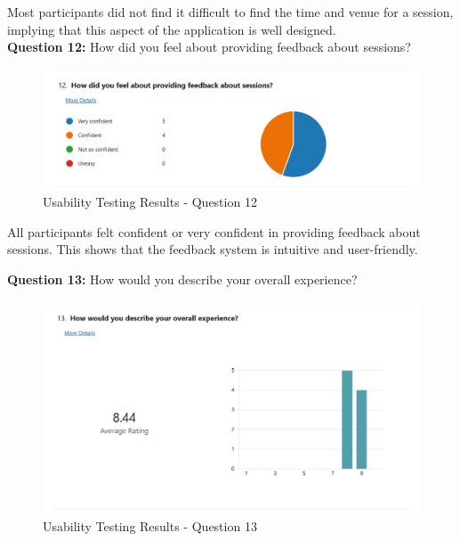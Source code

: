 \begin{justify}
\vspace{0.25cm}
\newendline  Most participants did not find it difficult to find the time and venue for a session, implying that this aspect of the application is well designed.\\


\vspace{0.25cm}
\newendline \textbf{Question 12:} How did you feel about providing feedback about sessions?

\begin{figure}[H]
    \centerline{\includegraphics[width=150mm,scale=1]{figures/implementation_and_testing/testing/MUT/answers/Answers (12).png}}
    \caption{Usability Testing Results - Question 12}
    \label{Usability Testing Results - Question 12}
\end{figure}

\vspace{0.25cm}
\newendline All participants felt confident or very confident in providing feedback about sessions. This shows that the feedback system is intuitive and user-friendly.\\


\clearpage

\vspace{0.25cm}
\newendline \textbf{Question 13:} How would you describe your overall experience?

\begin{figure}[H]
    \centerline{\includegraphics[width=150mm,scale=1]{figures/implementation_and_testing/testing/MUT/answers/Answers (13).png}}
    \caption{Usability Testing Results - Question 13}
    \label{Usability Testing Results - Question 13}
\end{figure}


\end{justify}
